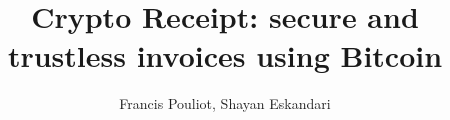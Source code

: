 \documentclass[envcountsect]{llncs}
\begin{document}
\frontmatter
\mainmatter

\title{\Large \bf{Crypto Receipt}: secure and trustless invoices using Bitcoin}

\author{Francis Pouliot, Shayan Eskandari}




\maketitle













\clearpage
\appendix
\end{document}

